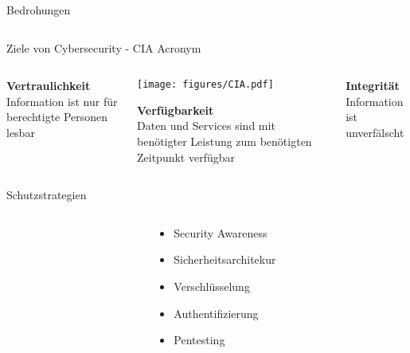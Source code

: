 {\begin{frame}{Bedrohungen}
\begin{columns}
    \end{columns}
\end{frame}

\begin{frame}{Ziele von Cybersecurity - CIA Acronym}
    \small
    \begin{columns}
        \begin{column}{0.3\textwidth}
            \begin{flushright}
                {\large\textbf{Vertraulichkeit}}
                \\Information ist nur für berechtigte Personen lesbar
                \vspace{3cm}
            \end{flushright}
        \end{column}

        \begin{column}{0.4\textwidth}
            \begin{center}
                \texttt{[image: figures/CIA.pdf]}
            \end{center}
            {\large\textbf{Verfügbarkeit}}
            \\Daten und Services sind mit benötigter Leistung zum benötigten Zeitpunkt verfügbar
            \vspace{0.5cm}
        \end{column}

        \begin{column}{0.3\textwidth}
            {\large\textbf{Integrität}}
            \\Information ist unverfälscht
            \vspace{3cm}
        \end{column}
    \end{columns}
\end{frame}

\begin{frame}{Schutzstrategien}
    \large
    \begin{columns}
        \begin{column}{1cm}
        \end{column}
        \begin{column}{8cm}
            \begin{itemize}
                \setlength{\itemsep}{10pt}
                \item Security Awareness 
                \item Sicherheitsarchitekur
                \item Verschlüsselung
                \item Authentifizierung
                \item Pentesting 
            \end{itemize}
        \end{column}
    \end{columns}
\end{frame}
}